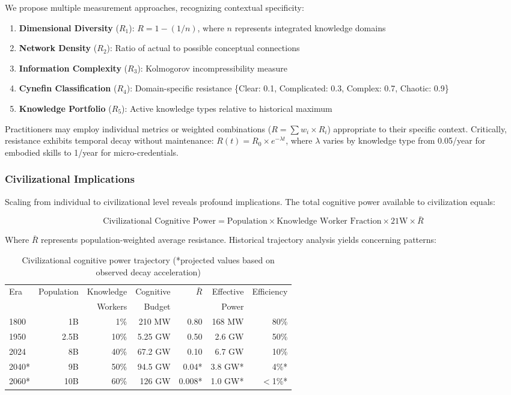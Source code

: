 We propose multiple measurement approaches, recognizing contextual specificity:

\begin{enumerate}
\item \textbf{Dimensional Diversity} ($R_1$): $R = 1 - (1/n)$, where $n$ represents integrated knowledge domains
\item \textbf{Network Density} ($R_2$): Ratio of actual to possible conceptual connections
\item \textbf{Information Complexity} ($R_3$): Kolmogorov incompressibility measure
\item \textbf{Cynefin Classification} ($R_4$): Domain-specific resistance \{Clear: 0.1, Complicated: 0.3, Complex: 0.7, Chaotic: 0.9\}
\item \textbf{Knowledge Portfolio} ($R_5$): Active knowledge types relative to historical maximum
\end{enumerate}

Practitioners may employ individual metrics or weighted combinations ($R = \sum w_i \times R_i$) appropriate to their specific context. Critically, resistance exhibits temporal decay without maintenance: $R(t) = R_0 \times e^{-\lambda t}$, where $\lambda$ varies by knowledge type from 0.05/year for embodied skills to 1/year for micro-credentials.

\subsubsection{Civilizational Implications}

Scaling from individual to civilizational level reveals profound implications. The total cognitive power available to civilization equals:

\begin{equation}
\text{Civilizational Cognitive Power} = \text{Population} \times \text{Knowledge Worker Fraction} \times 21\text{W} \times \bar{R}
\end{equation}

Where $\bar{R}$ represents population-weighted average resistance. Historical trajectory analysis yields concerning patterns:

\begin{table}[h]
\centering
\caption{Civilizational cognitive power trajectory (*projected values based on observed decay acceleration)}
\begin{tabular}{|l|r|r|r|r|r|r|}
\hline
Era & Population & Knowledge & Cognitive & $\bar{R}$ & Effective & Efficiency \\
    &            & Workers   & Budget    &           & Power     &            \\
\hline
1800 & 1B & 1\% & 210 MW & 0.80 & 168 MW & 80\% \\
1950 & 2.5B & 10\% & 5.25 GW & 0.50 & 2.6 GW & 50\% \\
2024 & 8B & 40\% & 67.2 GW & 0.10 & 6.7 GW & 10\% \\
2040* & 9B & 50\% & 94.5 GW & 0.04* & 3.8 GW* & 4\%* \\
2060* & 10B & 60\% & 126 GW & 0.008* & 1.0 GW* & $<$1\%* \\
\hline
\end{tabular}
\end{table}

